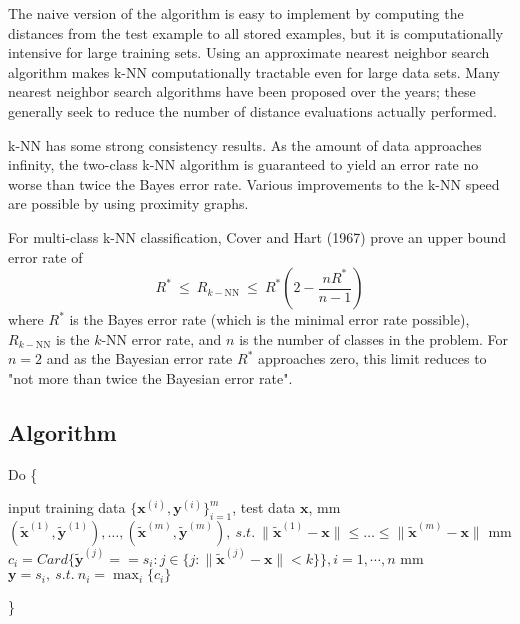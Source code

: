 The naive version of the algorithm is easy to implement by computing the distances from the test example to all stored examples, but it is computationally intensive for large training sets. Using an approximate nearest neighbor search algorithm makes k-NN computationally tractable even for large data sets. Many nearest neighbor search algorithms have been proposed over the years; these generally seek to reduce the number of distance evaluations actually performed.

k-NN has some strong consistency results. As the amount of data approaches infinity, the two-class k-NN algorithm is guaranteed to yield an error rate no worse than twice the Bayes error rate. Various improvements to the k-NN speed are possible by using proximity graphs.

For multi-class k-NN classification, Cover and Hart (1967) prove an upper bound error rate of
\[
	R^{*}\ \leq \ R_{k-\mathrm{NN} }\ \leq \ R^{*}\left(2-{\frac {nR^{*}}{n-1}}\right)
\]
where $R^{*}$ is the Bayes error rate (which is the minimal error rate possible), $R_{k-\mathrm{NN}}$ is the $k$-NN error rate, and $n$ is the number of classes in the problem. For $n=2$ and as the Bayesian error rate $R^{*}$ approaches zero, this limit reduces to "not more than twice the Bayesian error rate".

\newpage
\subsection{Algorithm}
Do \{

	\noindent\qquad input training data $\{\boldsymbol x^{(i)},\boldsymbol y^{(i)}\}_{i=1}^{m}$, test data $\boldsymbol x$, 
	 mm
	\qquad$(\tilde{\boldsymbol x} ^{(1)},\tilde{\boldsymbol y} ^{(1)}),\dots ,(\tilde{\boldsymbol x} ^{(m)},\tilde{\boldsymbol y} ^{(m)}),~s.t.~\|\tilde{\boldsymbol x} ^{(1)}-\boldsymbol x\|\leq \dots \leq \|\tilde{\boldsymbol x} ^{(m)}-\boldsymbol x\|$
	 mm
	\qquad $c_i=Card\{\tilde{\boldsymbol y}^{(j)} == s_i: j\in\{j:\|\tilde{\boldsymbol x}^{(j)} - \boldsymbol x\| <k\}\}, i=1,\cdots, n$
	 mm
	\qquad$\boldsymbol y = s_i,~s.t.~n_i=\max_{i}\{c_i\}$

\}

 













